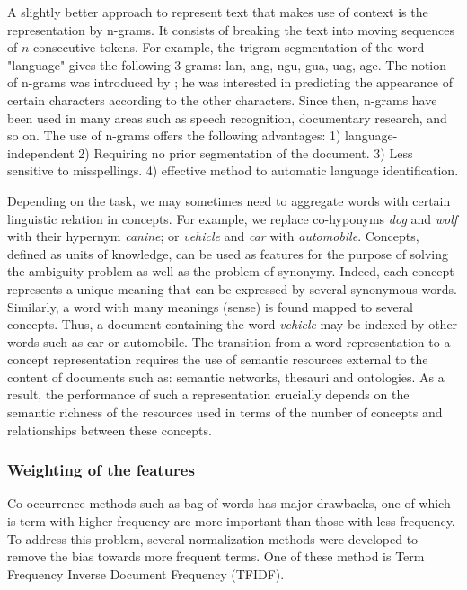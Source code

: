 A slightly better approach to represent text that makes use of context is the representation by n-grams. It consists of breaking the text into moving sequences of $n$ consecutive tokens. For example, the trigram segmentation of the word "language" gives the following 3-grams: lan, ang, ngu, gua, uag, age. The notion of n-grams was introduced by  \citep{shannon1948mathematical}; he was interested in predicting the appearance of certain characters according to the other characters. Since then, n-grams have been used in many areas such as speech recognition, documentary research, and so on. The use of n-grams offers the following advantages: 1) language-independent 2) Requiring no prior segmentation of the document. 3) Less sensitive to misspellings. 4) effective method to automatic language identification.



Depending on the task, we may sometimes need to aggregate words with certain linguistic relation in concepts. For example, we replace co-hyponyms \emph{dog} and \emph{wolf} with their hypernym \emph{canine}; or \emph{vehicle} and \emph{car} with \emph{automobile}. Concepts, defined as units of knowledge, can be used as features for the purpose of solving the ambiguity problem as well as the problem of synonymy. Indeed, each concept represents a unique meaning that can be expressed by several synonymous words. Similarly, a word with many meanings (sense) is found mapped to several concepts. Thus, a document containing the word \emph{vehicle} may be indexed by other words such as car or automobile. The transition from a word representation to a concept representation requires the use of semantic resources external to the content of documents such as: semantic networks, thesauri and ontologies. As a result, the performance of such a representation crucially depends on the semantic richness of the resources used in terms of the number of concepts and relationships between these concepts.

\subsubsection{Weighting of the features}

Co-occurrence methods such as bag-of-words has major drawbacks, one of which is term with higher frequency are more important than those with less frequency. To address this problem, several normalization methods were developed to remove the bias towards more frequent terms. One of these method is Term Frequency Inverse Document Frequency (TFIDF).

